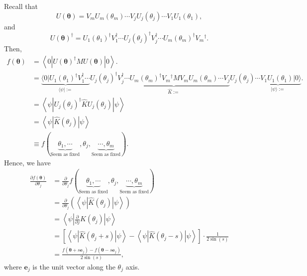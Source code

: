 Recall that
\begin{equation}
    U(\boldsymbol{\theta})=V_m U_m\left(\theta_m\right) \cdots V_j U_j\left(\theta_j\right) \cdots V_1 U_1\left(\theta_1\right),
\end{equation}
and
\begin{equation}
    U(\boldsymbol{\theta})^{\dagger}=U_1\left(\theta_1\right)^{\dagger} V_1^{\dagger} \cdots U_j\left(\theta_j\right)^{\dagger} V_j^{\dagger} \cdots U_m\left(\theta_m\right)^{\dagger} V_m{ }^{\dagger}.
\end{equation}
Then, 
\begin{align}
f(\boldsymbol{\theta}) & =\left\langle 0\left|U(\boldsymbol{\theta})^{\dagger} M U(\boldsymbol{\theta})\right| 0\right\rangle .\\
& =\underbrace{\langle 0| U_1\left(\theta_1\right)^{\dagger} V_1^{\dagger} \cdots}_{\langle\psi|:=} 
U_j\left(\theta_j\right)^{\dagger} 
\underbrace{V_j^{\dagger} \cdots U_m\left(\theta_m\right)^{\dagger} V_m{ }^{\dagger}  M V_m U_m\left(\theta_m\right) \cdots V_j}_{\hat{K}:=}   
U_j\left(\theta_j\right) \underbrace{\cdots V_1 U_1\left(\theta_1\right)| 0 \rangle }_{|\psi\rangle :=}.\\
&=\left\langle\psi\left|U_j\left(\theta_j\right)^{\dagger} \hat{K} U_j\left(\theta_j\right)\right| \psi\right\rangle \\
&=\left\langle\psi\left|  \hat{K}\left(\theta_j\right) \right| \psi\right\rangle \\
&\equiv f(\underbrace{\theta_1, \cdots}_{\text {Seem as fixed}}, \theta_j, \underbrace{\cdots, \theta_m}_{\text {Seem as fixed}}).
\end{align}
Hence, we have 
\begin{align}
\frac{\partial f(\boldsymbol{\theta})}{\partial \theta_j} 
& =\frac{\partial}{\partial \theta_j}   f(\underbrace{\theta_1, \cdots}_{\text {Seem as fixed}}, \theta_j, \underbrace{\cdots, \theta_m}_{\text {Seem as fixed}}) \\
& =\frac{\partial}{\partial \theta_j}\left(\left\langle\psi\left|\hat{K}\left(\theta_j\right)\right| \psi\right\rangle\right) \\ 
& =\left\langle\psi\left|\frac{\partial}{\partial j} \hat{K}\left(\theta_j\right)\right| \psi\right\rangle \\
& =\left[\left\langle\psi\left|\hat{K}\left(\theta_j+s\right)\right| \psi\right\rangle-\left\langle\psi\left|\hat{K}\left(\theta_j-s\right)\right| \psi\right\rangle\right] \cdot \frac{1}{2 \sin (s)} \\
& =\frac{f\left(\boldsymbol{\theta}+s \mathbf{e}_j\right)-f\left(\boldsymbol{\theta}-s \mathbf{e}_j\right)}{2 \sin (s)},
\end{align}
where $\mathbf{e}_j$ is the unit vector along the $\theta_j$ axis.

